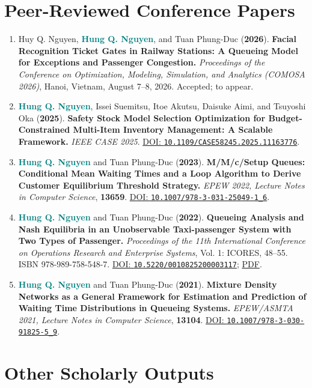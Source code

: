 \documentclass[10pt,a4paper]{article}
\newcommand{\myname}{\textbf{\textcolor{Teal}{Hung Q. Nguyen}}}
\newcommand{\papertitle}[1]{\textbf{#1}}
\newcommand{\doilink}[1]{\href{https://doi.org/#1}{DOI: \nolinkurl{#1}}}
\newenvironment{publicationlist}{%
  \begin{enumerate}[
    label=\textcolor{Gold}{\bfseries\arabic*.},
    leftmargin=2.1em,
    labelsep=0.55em,
    itemsep=6pt,
    topsep=2pt,
    parsep=0pt,
    partopsep=0pt
  ]\small
}{\end{enumerate}}
\begin{document}
\section{Peer-Reviewed Conference Papers}
\begin{publicationlist}
  \item Huy Q. Nguyen, \myname{}, and Tuan Phung-Duc (\textbf{2026}). \papertitle{Facial Recognition Ticket Gates in Railway Stations: A Queueing Model for Exceptions and Passenger Congestion.} \emph{Proceedings of the Conference on Optimization, Modeling, Simulation, and Analytics (COMOSA 2026)}, Hanoi, Vietnam, August 7--8, 2026. Accepted; to appear.

  \item \myname{}, Issei Suemitsu, Itoe Akutsu, Daisuke Aimi, and Tsuyoshi Oka (\textbf{2025}). \papertitle{Safety Stock Model Selection Optimization for Budget-Constrained Multi-Item Inventory Management: A Scalable Framework.} \emph{IEEE CASE 2025}. \doilink{10.1109/CASE58245.2025.11163776}.

  \item \myname{} and Tuan Phung-Duc (\textbf{2023}). \papertitle{M/M/c/Setup Queues: Conditional Mean Waiting Times and a Loop Algorithm to Derive Customer Equilibrium Threshold Strategy.} \emph{EPEW 2022, Lecture Notes in Computer Science}, \textbf{13659}. \doilink{10.1007/978-3-031-25049-1_6}.

  \item \myname{} and Tuan Phung-Duc (\textbf{2022}). \papertitle{Queueing Analysis and Nash Equilibria in an Unobservable Taxi-passenger System with Two Types of Passenger.} \emph{Proceedings of the 11th International Conference on Operations Research and Enterprise Systems}, Vol. 1: ICORES, 48--55. ISBN 978-989-758-548-7. \doilink{10.5220/0010825200003117}; \href{https://www.scitepress.org/Papers/2022/108252/108252.pdf}{PDF}.

  \item \myname{} and Tuan Phung-Duc (\textbf{2021}). \papertitle{Mixture Density Networks as a General Framework for Estimation and Prediction of Waiting Time Distributions in Queueing Systems.} \emph{EPEW/ASMTA 2021, Lecture Notes in Computer Science}, \textbf{13104}. \doilink{10.1007/978-3-030-91825-5_9}.
\end{publicationlist}

\section{Other Scholarly Outputs}
\end{document}
